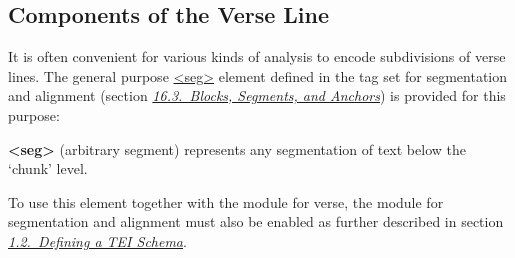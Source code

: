 \subsection[{Components of the Verse Line}]{Components of the Verse Line}\label{VESE}\par
It is often convenient for various kinds of analysis to encode subdivisions of verse lines. The general purpose \hyperref[TEI.seg]{<seg>} element defined in the tag set for segmentation and alignment (section \textit{\hyperref[SASE]{16.3.\ Blocks, Segments, and Anchors}}) is provided for this purpose: 
\begin{sansreflist}
  
\item [\textbf{<seg>}] (arbitrary segment) represents any segmentation of text below the ‘chunk’ level.
\end{sansreflist}
\par
To use this element together with the module for verse, the module for segmentation and alignment must also be enabled as further described in section \textit{\hyperref[STIN]{1.2.\ Defining a TEI Schema}}.\par

